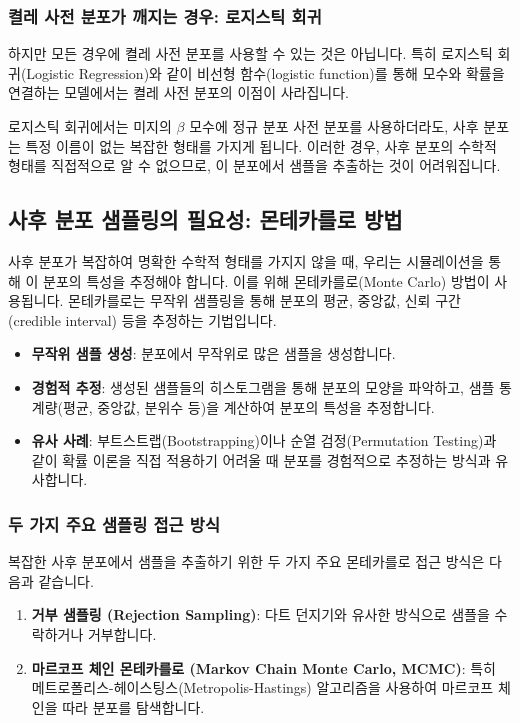 \documentclass[11pt,a4paper]{article}
\theoremstyle{definition}
\begin{document}
\subsubsection*{켤레 사전 분포가 깨지는 경우: 로지스틱 회귀}
하지만 모든 경우에 켤레 사전 분포를 사용할 수 있는 것은 아닙니다. 특히 로지스틱 회귀(Logistic Regression)와 같이 비선형 함수(logistic function)를 통해 모수와 확률을 연결하는 모델에서는 켤레 사전 분포의 이점이 사라집니다.

\begin{warningbox}[title=로지스틱 회귀의 문제점]
로지스틱 회귀에서는 미지의 $\beta$ 모수에 정규 분포 사전 분포를 사용하더라도, 사후 분포는 특정 이름이 없는 복잡한 형태를 가지게 됩니다.
이러한 경우, 사후 분포의 수학적 형태를 직접적으로 알 수 없으므로, 이 분포에서 샘플을 추출하는 것이 어려워집니다.
\end{warningbox}

\subsection*{사후 분포 샘플링의 필요성: 몬테카를로 방법}
사후 분포가 복잡하여 명확한 수학적 형태를 가지지 않을 때, 우리는 시뮬레이션을 통해 이 분포의 특성을 추정해야 합니다. 이를 위해 몬테카를로(Monte Carlo) 방법이 사용됩니다. 몬테카를로는 무작위 샘플링을 통해 분포의 평균, 중앙값, 신뢰 구간(credible interval) 등을 추정하는 기법입니다.

\begin{infobox}[title=몬테카를로 방법의 핵심]
\begin{itemize}
    \item \textbf{무작위 샘플 생성}: 분포에서 무작위로 많은 샘플을 생성합니다.
    \item \textbf{경험적 추정}: 생성된 샘플들의 히스토그램을 통해 분포의 모양을 파악하고, 샘플 통계량(평균, 중앙값, 분위수 등)을 계산하여 분포의 특성을 추정합니다.
    \item \textbf{유사 사례}: 부트스트랩(Bootstrapping)이나 순열 검정(Permutation Testing)과 같이 확률 이론을 직접 적용하기 어려울 때 분포를 경험적으로 추정하는 방식과 유사합니다.
\end{itemize}
\end{infobox}

\subsubsection*{두 가지 주요 샘플링 접근 방식}
복잡한 사후 분포에서 샘플을 추출하기 위한 두 가지 주요 몬테카를로 접근 방식은 다음과 같습니다.
\begin{enumerate}
    \item \textbf{거부 샘플링 (Rejection Sampling)}: 다트 던지기와 유사한 방식으로 샘플을 수락하거나 거부합니다.
    \item \textbf{마르코프 체인 몬테카를로 (Markov Chain Monte Carlo, MCMC)}: 특히 메트로폴리스-헤이스팅스(Metropolis-Hastings) 알고리즘을 사용하여 마르코프 체인을 따라 분포를 탐색합니다.
\end{enumerate}
\end{document}

